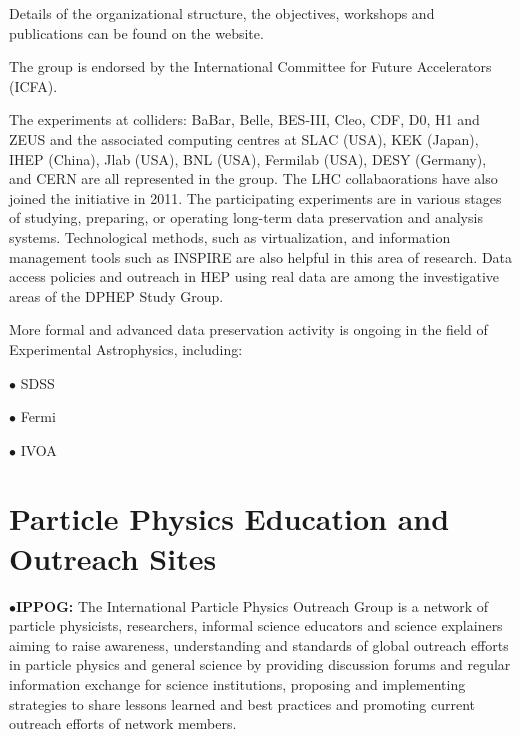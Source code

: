 \item{}Details of the organizational structure, the objectives, workshops and publications can be found on the website.

\item{}The group is endorsed by the International Committee for Future Accelerators (ICFA).

\item{}The experiments at colliders: BaBar, Belle, BES-III, Cleo, CDF, D0, H1 and ZEUS and the associated computing centres at SLAC (USA), KEK (Japan), IHEP (China), Jlab (USA), BNL (USA), Fermilab (USA), DESY (Germany), and CERN are all represented in the group. The LHC collabaorations have also joined the initiative in 2011. The participating experiments are in various stages of studying, preparing, or operating long-term data preservation and analysis systems. Technological methods, such as virtualization, and information management tools such as INSPIRE are also helpful in this area of research. Data access policies and outreach in HEP using real data are among the investigative areas of the DPHEP Study Group.

	\item{}

\medskip
\medskip


\medskip

More formal and advanced data preservation activity is ongoing in the field of Experimental Astrophysics, including:
\item{$\bullet$}
SDSS \item{}
\item{$\bullet$}
Fermi \item{} 
\item{$\bullet$}
IVOA \item{}

\medskip


\section{Particle Physics Education and Outreach Sites}  %

\medskip



\medskip


\item{$\bullet$}{\bf IPPOG:}
The International Particle Physics Outreach Group is a network of particle physicists, researchers, informal science educators and science explainers aiming to raise awareness, understanding and standards of global outreach efforts in particle physics and general science by providing discussion forums and regular information exchange for science institutions, proposing and implementing strategies to share lessons learned and best practices and promoting current outreach efforts of network members.
	\item{}

